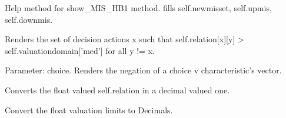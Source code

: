 \documentclass[letterpaper,10pt,english]{sphinxmanual}
\begin{document}
\begin{fulllineitems}
\begin{fulllineitems}
\end{fulllineitems}


\begin{fulllineitems}
\label{techDoc:digraphs.Digraph.computeupdown2irred}
Help method for show\_MIS\_HB1 method.
fills self.newmisset, self.upmis, self.downmis.

\end{fulllineitems}


\begin{fulllineitems}
\label{techDoc:digraphs.Digraph.condorcetWinners}
Renders the set of decision actions x such that
self.relation{[}x{]}{[}y{]} \textgreater{} self.valuationdomain{[}'med'{]}
for all y != x.

\end{fulllineitems}


\begin{fulllineitems}
\label{techDoc:digraphs.Digraph.contra}
Parameter: choice.
Renders the negation of a choice v characteristic's vector.

\end{fulllineitems}


\begin{fulllineitems}
\label{techDoc:digraphs.Digraph.convertRelationToDecimal}
Converts the float valued self.relation in a decimal valued one.

\end{fulllineitems}


\begin{fulllineitems}
\label{techDoc:digraphs.Digraph.convertValuationToDecimal}
Convert the float valuation limits to Decimals.

\end{fulllineitems}


\end{fulllineitems}
\end{document}
